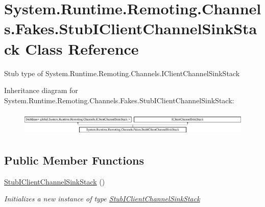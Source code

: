 \hypertarget{class_system_1_1_runtime_1_1_remoting_1_1_channels_1_1_fakes_1_1_stub_i_client_channel_sink_stack}{\section{System.\-Runtime.\-Remoting.\-Channels.\-Fakes.\-Stub\-I\-Client\-Channel\-Sink\-Stack Class Reference}
\label{class_system_1_1_runtime_1_1_remoting_1_1_channels_1_1_fakes_1_1_stub_i_client_channel_sink_stack}
}


Stub type of System.\-Runtime.\-Remoting.\-Channels.\-I\-Client\-Channel\-Sink\-Stack 


Inheritance diagram for System.\-Runtime.\-Remoting.\-Channels.\-Fakes.\-Stub\-I\-Client\-Channel\-Sink\-Stack\-:\begin{figure}[H]
\begin{center}
\leavevmode
\includegraphics[height=1.176471cm]{class_system_1_1_runtime_1_1_remoting_1_1_channels_1_1_fakes_1_1_stub_i_client_channel_sink_stack}
\end{center}
\end{figure}
\subsection*{Public Member Functions}
\begin{DoxyCompactItemize}
\item 
\hyperlink{class_system_1_1_runtime_1_1_remoting_1_1_channels_1_1_fakes_1_1_stub_i_client_channel_sink_stack_a6d8328c7a94805a1e341b92165c6d35a}{Stub\-I\-Client\-Channel\-Sink\-Stack} ()
\begin{DoxyCompactList}\small\item\em Initializes a new instance of type \hyperlink{class_system_1_1_runtime_1_1_remoting_1_1_channels_1_1_fakes_1_1_stub_i_client_channel_sink_stack}{Stub\-I\-Client\-Channel\-Sink\-Stack}\end{DoxyCompactList}\end{DoxyCompactItemize}
